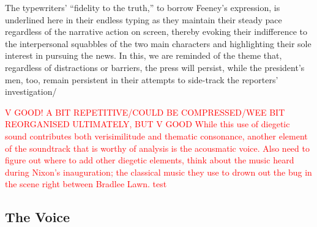 The typewriters’ ``fidelity to the truth,” to borrow Feeney’s expression, is underlined here in their endless typing as they maintain their steady pace regardless of the narrative action on screen, thereby evoking their indifference to the interpersonal squabbles of the two main characters and highlighting their sole interest in pursuing the news.
In this, we are reminded of the theme that, regardless of distractions or barriers, the press will persist, while the president’s men, too, remain persistent in their attempts to side-track the reporters’ investigation/

\textcolor{red}{V GOOD! A BIT REPETITIVE/COULD BE COMPRESSED/WEE BIT REORGANISED ULTIMATELY, BUT V GOOD
While this use of diegetic sound contributes both verisimilitude and thematic consonance, another element of the soundtrack that is worthy of analysis is the acousmatic voice.
Also need to figure out where to add other diegetic elements, think about the music heard during Nixon's inauguration; the classical music they use to drown out the bug in the scene right between Bradlee Lawn. test}




\subsection{The Voice}

